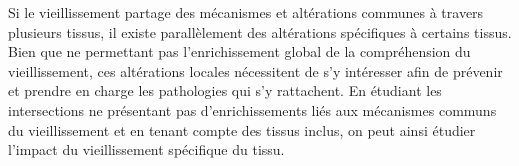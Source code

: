 Si le vieillissement partage des mécanismes et altérations communes à travers plusieurs tissus, il existe parallèlement des altérations spécifiques à certains tissus. Bien que ne permettant pas l'enrichissement global de la compréhension du vieillissement, ces altérations locales nécessitent de s'y intéresser afin de prévenir et prendre en charge les pathologies qui s'y rattachent. En étudiant les intersections ne présentant pas d'enrichissements liés aux mécanismes communs du vieillissement et en tenant compte des tissus inclus, on peut ainsi étudier l'impact du vieillissement spécifique du tissu.

